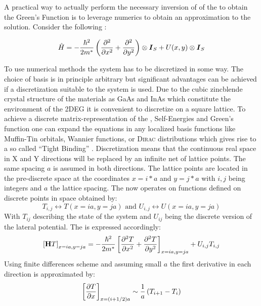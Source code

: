 A practical way to actually perform the necessary inversion of of the \hamil{} to obtain the Green's Function is to leverage numerics to obtain an approximation to the solution.
Consider the following \hamil{}:

\begin{equation}
	\hat{H} = -\frac{\hbar^{2}}{2m^*}\left(\frac{\partial^2 }{\partial x^2}+\frac{\partial^2 }{\partial y^2}\right) \otimes \boldsymbol{I}_S + U(x,y) \otimes \boldsymbol{I}_S
  \label{eqn:effectivemasshamiltonian}
\end{equation}

To use numerical methods the system has to be discretized in some way. The choice of basis is in principle arbitrary but significant advantages can be achieved if a discretization suitable to the system is used.
Due to the cubic zincblende crystal structure of the materials as GaAs and InAs which constitute the environment of the 2DEG it is convenient to discretize on a square lattice.
To achieve a discrete matrix-representation of the \hamil{}, Self-Energies and Green's function one can expand the equations in any localized basis functions like Muffin-Tin orbitals, Wannier functions, or \textsc{Dirac} distributions which gives rise to a so called ``Tight Binding'' \hamil{}. Discretization means that the continuous real space in X and Y directions will be replaced by an infinite net of lattice points. The same spacing $a$ is assumed in both directions. The lattice points are located in the pre-discrete space at the coordinates $x=i*a$ and $y=j*a$ with $i,j$ being integers and $a$ the lattice spacing. The \hamil{} now operates on functions defined on discrete points in space obtained by:
\begin{equation}
  T_{i,j} \leftrightarrow T(x=ia,y=ja) \mbox{ and } U_{i,j}\leftrightarrow U(x=ia,y=ja)
  \label{FunctionDescrete}
\end{equation}
With $T_{ij}$ describing the state of the system and $U_{ij}$ being the discrete version of the lateral potential.
The \hamil{} is expressed accordingly:
\begin{equation}
  \left[\mathbf{H}T\right]_{x=ia,y=ja}=-\frac{\hbar^{2}}{2m^*}\left[\frac{\partial^2 T}{\partial x^2}+\frac{\partial^2 T}{\partial y^2}\right]_{x=ia,y=ja}+U_{i,j}T_{i,j}
  \label{DiscreteHamil}
\end{equation}
Using finite differences scheme and assuming small $a$ the first derivative in each direction is approximated by:
\begin{equation}
  \left[\frac{\partial T}{\partial x}\right]_{x=(i+1/2)a} \sim  \frac{1}{a}\left(T_{i+1}-T_{i}\right)
  \label{ApproximateFirstDerivative}
\end{equation}
